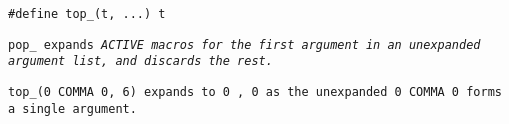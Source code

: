 
\tt{#define top_(t, ...) t}


\tt{pop_} expands \it{\tt{ACTIVE}} macros for the first argument
in an unexpanded argument list, and discards the rest.

\example \tt{top_(0 COMMA 0, 6)} expands to \tt{0 , 0}
as the unexpanded \tt{0 COMMA 0} forms a single argument.
